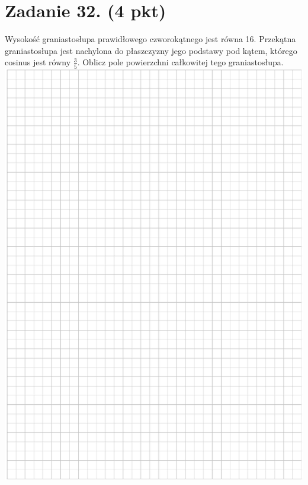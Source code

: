 \documentclass[10pt]{article}
\begin{document}
\section*{Zadanie 32. (4 pkt)}
Wysokość graniastosłupa prawidłowego czworokątnego jest równa 16. Przekątna graniastosłupa jest nachylona do płaszczyzny jego podstawy pod kątem, którego cosinus jest równy \(\frac{3}{5}\). Oblicz pole powierzchni całkowitej tego graniastosłupa.\\
\includegraphics[max width=\textwidth, center]{2024_11_21_e19607c15353cb4d7e48g-18}\\
\end{document}
